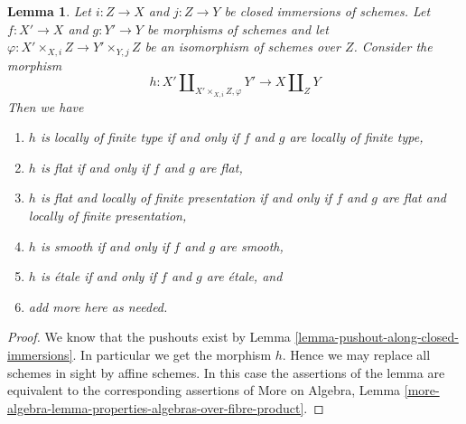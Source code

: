 \documentclass[10pt,a4paper]{amsart}
\theoremstyle{plain}
\newtheorem{lemma}[subsection]{Lemma}
\theoremstyle{definition}
\theoremstyle{remark}
\numberwithin{equation}{subsection}
\begin{document}
\begin{lemma}
\label{lemma-pushout-along-closed-immersions-properties-above}
Let $i : Z \to X$ and $j : Z \to Y$ be closed immersions of schemes.
Let $f : X' \to X$ and $g : Y' \to Y$ be morphisms of schemes and let
$\varphi : X' \times_{X, i} Z \to Y' \times_{Y, j} Z$
be an isomorphism of schemes over $Z$. Consider the morphism
$$
h :
X' \amalg_{X' \times_{X, i} Z, \varphi} Y'
\longrightarrow
X \amalg_Z Y
$$
Then we have
\begin{enumerate}
\item $h$ is locally of finite type if and only if $f$ and $g$ are
locally of finite type,
\item $h$ is flat if and only if $f$ and $g$ are flat,
\item $h$ is flat and locally of finite presentation if and only if
$f$ and $g$ are flat and locally of finite presentation,
\item $h$ is smooth if and only if $f$ and $g$ are smooth,
\item $h$ is \'etale if and only if $f$ and $g$ are \'etale, and
\item add more here as needed.
\end{enumerate}
\end{lemma}

\begin{proof}
We know that the pushouts exist by
Lemma \ref{lemma-pushout-along-closed-immersions}.
In particular we get the morphism $h$.
Hence we may replace all schemes in sight by
affine schemes. In this case the assertions of the lemma
are equivalent to the corresponding assertions of
More on Algebra, Lemma
\ref{more-algebra-lemma-properties-algebras-over-fibre-product}.
\end{proof}
\end{document}
